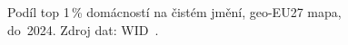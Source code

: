 \def\strEuBohatstviTopIWidTitle{Podíl top 1\,\% domácností na čistém jmění (WID, do 2024)}%
\def\strEuBohatstviTopIWidColorbarLabel{podíl top 1\,\% na čistém jmění [\%]}%
\def\strEuBohatstviTopIWidCaption{Podíl top 1\,\% domácností na čistém jmění, \acs{geo-EU27} mapa, do~2024. Zdroj dat: \acs{WID}~\cite{wid_world_shweal}.}%
%
\begin{figure}[htbp]
  \centering
  \resizebox{\linewidth}{!}{}
  \caption{\strEuBohatstviTopIWidCaption}
  \label{fig:eu_bohatstvi_top1_wid}
\end{figure}
